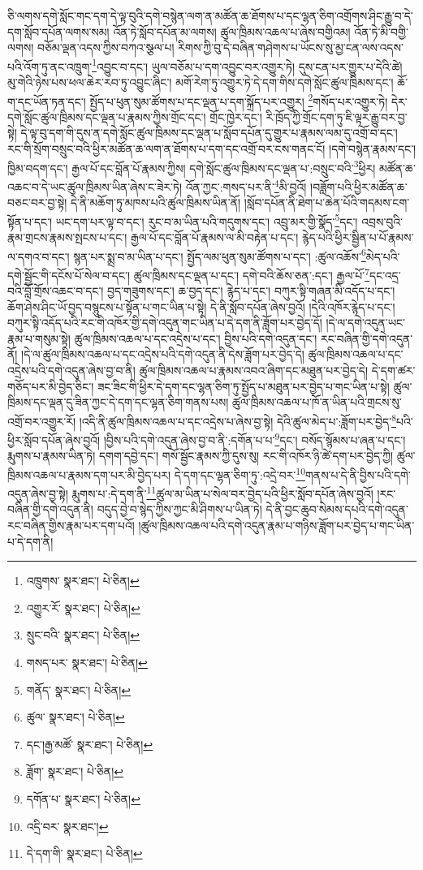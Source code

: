 ཅི་ལགས་དགེ་སློང་གང་དག་དེ་ལྟ་བུའི་དགེ་བསྙེན་ལག་ན་མཚོན་ཆ་ཐོགས་པ་དང་ལྷན་ཅིག་འགྲོགས་ཤིང་རྒྱུ་བ་དེ་དག་སློབ་དཔོན་ལགས་སམ། འོན་ཏེ་སློབ་དཔོན་མ་ལགས། ཚུལ་ཁྲིམས་འཆལ་པ་ཞེས་བགྱིའམ། འོན་ཏེ་མི་བགྱི་ལགས། བཅོམ་ལྡན་འདས་ཀྱིས་བཀའ་སྩལ་པ། རིགས་ཀྱི་བུ་དེ་བཞིན་གཤེགས་པ་ཡོངས་སུ་མྱ་ངན་ལས་འདས་པའི་འོག་ཏུ་ནང་འཁྲུག་\footnote{འཁྲུགས་  སྣར་ཐང་།  པེ་ཅིན། }འབྱུང་བ་དང་། ཡུལ་བཅོམ་པ་དག་འབྱུང་བར་འགྱུར་ཏེ། དུས་ངན་པར་གྱུར་པ་དེའི་ཚེ། མུ་གེའི་ཉེས་པས་ཕལ་ཆེར་རབ་ཏུ་འབྱུང་ཞིང་། མགོ་རེག་ཏུ་འགྱུར་ཏེ་དེ་དག་གིས་དགེ་སློང་ཚུལ་ཁྲིམས་དང་། ཆོ་ག་དང་ཡོན་ཏན་དང་། སྤྱོད་པ་ཕུན་སུམ་ཚོགས་པ་དང་ལྡན་པ་དག་སྐྲོད་པར་འགྱུར། \footnote{འགྱུར་རོ་  སྣར་ཐང་།  པེ་ཅིན། }གསོད་པར་འགྱུར་ཏེ། དེར་དགེ་སློང་ཚུལ་ཁྲིམས་དང་ལྡན་པ་རྣམས་ཀྱིས་གྲོང་དང་། གྲོང་ཁྱེར་དང་། རི་ཁྲོད་ཀྱི་གྲོང་དག་ཏུ་ཇི་ལྟར་རྒྱུ་བར་བྱ་སྟེ། དེ་ལྟ་བུ་དག་གི་དུས་ན་དགེ་སློང་ཚུལ་ཁྲིམས་དང་ལྡན་པ་སློབ་དཔོན་དུ་གྱུར་པ་རྣམས་ལམ་དུ་འགྲོ་བ་དང་། རང་གི་སྲོག་བསྲུང་བའི་ཕྱིར་མཚོན་ཆ་ལག་ན་ཐོགས་པ་དག་དང་འགྲོ་བར་ངས་གནང་ངོ། །དགེ་བསྙེན་རྣམས་དང་། ཁྱིམ་བདག་དང་། རྒྱལ་པོ་དང་བློན་པོ་རྣམས་ཀྱིས། དགེ་སློང་ཚུལ་ཁྲིམས་དང་ལྡན་པ་:བསྲུང་བའི་\footnote{སྲུང་བའི་  སྣར་ཐང་།  པེ་ཅིན། }ཕྱིར། མཚོན་ཆ་འཆང་བ་དེ་ཡང་ཚུལ་ཁྲིམས་ཡིན་ཞེས་ང་ཟེར་ཏེ། འོན་ཀྱང་:གསད་པར་ནི་\footnote{གསད་པར་  སྣར་ཐང་།  པེ་ཅིན། }མི་བྱའོ། །བཟློག་པའི་ཕྱིར་མཚོན་ཆ་བཅང་བར་བྱ་སྟེ། དེ་ནི་མཆོག་ཏུ་མཁས་པའི་ཚུལ་ཁྲིམས་ཡིན་ནོ། །སློབ་དཔོན་ནི་ཐེག་པ་ཆེན་པོའི་གདམས་ངག་སྟོན་པ་དང་། ཡང་དག་པར་ལྟ་བ་དང་། རུང་བ་མ་ཡིན་པའི་གདུགས་དང་། འབྲུ་མར་གྱི་སྣོད་\footnote{གནོད་  སྣར་ཐང་།  པེ་ཅིན། }དང་། འབྲས་བུའི་རྣམ་གྲངས་རྣམས་སྤངས་པ་དང་། རྒྱལ་པོ་དང་བློན་པོ་རྣམས་ལ་མི་བརྟེན་པ་དང་། རྙེད་པའི་ཕྱིར་སྦྱིན་པ་པོ་རྣམས་ལ་དགའ་བ་དང་། སྙན་པར་སྨྲ་བ་མ་ཡིན་པ་དང་། སྤྱོད་ལམ་ཕུན་སུམ་ཚོགས་པ་དང་། :ཚུལ་འཆོས་\footnote{ཚུལ་  སྣར་ཐང་།  པེ་ཅིན། }མེད་པའི་དགེ་སྦྱོང་གི་དངོས་པོ་སེལ་བ་དང་། ཚུལ་ཁྲིམས་དང་ལྡན་པ་དང་། དགེ་བའི་ཆོས་ཅན་:དང་། རྒྱལ་པོ་\footnote{དང་།རྒྱ་མཚོ་  སྣར་ཐང་།  པེ་ཅིན། }དང་འདྲ་བའི་བློ་གྲོས་འཆང་བ་དང་། བྱད་གཟུགས་དང་། ཆ་བྱད་དང་། རྙེད་པ་དང་། བཀུར་སྟི་གཞན་མི་འདོད་པ་དང་། ཆོག་ཤེས་ཤིང་ཡོ་བྱད་བསྙུངས་པ་སྟོན་པ་གང་ཡིན་པ་སྟེ། དེ་ནི་སློབ་དཔོན་ཞེས་བྱའོ། །དེའི་འཁོར་རྙེད་པ་དང་། བཀུར་སྟི་འདོད་པའི་རང་གི་འཁོར་གྱི་དགེ་འདུན་གང་ཡིན་པ་དེ་དག་ནི་ཟློག་པར་བྱེད་དོ། །དེ་ལ་དགེ་འདུན་ཡང་རྣམ་པ་གསུམ་སྟེ། ཚུལ་ཁྲིམས་འཆལ་པ་དང་འདྲེས་པ་དང་། བྱིས་པའི་དགེ་འདུན་དང་། རང་བཞིན་གྱི་དགེ་འདུན་ནོ། །དེ་ལ་ཚུལ་ཁྲིམས་འཆལ་པ་དང་འདྲེས་པའི་དགེ་འདུན་ནི་དེས་ཟློག་པར་བྱེད་དེ། ཚུལ་ཁྲིམས་འཆལ་པ་དང་འདྲེས་པའི་དགེ་འདུན་ཞེས་བྱ་བ་ནི། ཚུལ་ཁྲིམས་འཆལ་པ་རྣམས་འབའ་ཞིག་དང་མཐུན་པར་བྱེད་དེ། དེ་དག་ཚར་གཅོད་པར་མི་བྱེད་ཅིང་། ཟང་ཟིང་གི་ཕྱིར་དེ་དག་དང་ལྷན་ཅིག་ཏུ་སྤྱོད་པ་མཐུན་པར་བྱེད་པ་གང་ཡིན་པ་སྟེ། ཚུལ་ཁྲིམས་དང་ལྡན་དུ་ཟིན་ཀྱང་དེ་དག་དང་ལྷན་ཅིག་གནས་པས། ཚུལ་ཁྲིམས་འཆལ་པ་ཁོ་ན་ཡིན་པའི་གྲངས་སུ་འགྲོ་བར་འགྱུར་རོ། །འདི་ནི་ཚུལ་ཁྲིམས་འཆལ་པ་དང་འདྲེས་པ་ཞེས་བྱ་སྟེ། དེའི་ཚུལ་མེད་པ་:ཟློག་པར་བྱེད་\footnote{ཟློག་  སྣར་ཐང་།  པེ་ཅིན། }པའི་ཕྱིར་སློབ་དཔོན་ཞེས་བྱའོ། །བྱིས་པའི་དགེ་འདུན་ཞེས་བྱ་བ་ནི་:དགོན་པ་པ་\footnote{དགོན་པ་  སྣར་ཐང་།  པེ་ཅིན། }དང་། བསོད་སྙོམས་པ་ཞན་པ་དང་། རྨུགས་པ་རྣམས་ཡིན་ཏེ། དགག་དབྱེ་དང་། གསོ་སྦྱོང་རྣམས་ཀྱི་དུས་སུ། རང་གི་འཁོར་ཉི་ཚེ་དག་པར་བྱེད་ཀྱི། ཚུལ་ཁྲིམས་འཆལ་པ་རྣམས་དག་པར་མི་བྱེད་པར། དེ་དག་དང་ལྷན་ཅིག་ཏུ་:འདྲེ་བར་\footnote{འདྲི་བར་  སྣར་ཐང་། }གནས་པ་དེ་ནི་བྱིས་པའི་དགེ་འདུན་ཞེས་བྱ་སྟེ། རྨུགས་པ་:དེ་དག་ནི་\footnote{དེ་དག་གི་  སྣར་ཐང་།  པེ་ཅིན། }ཚུལ་མ་ཡིན་པ་སེལ་བར་བྱེད་པའི་ཕྱིར་སློབ་དཔོན་ཞེས་བྱའོ། །རང་བཞིན་གྱི་དགེ་འདུན་ནི། བདུད་བྱེ་བ་སྙེད་ཀྱིས་ཀྱང་མི་ཤིགས་པ་ཡིན་ཏེ། དེ་ནི་བྱང་ཆུབ་སེམས་དཔའི་དགེ་འདུན་རང་བཞིན་གྱིས་རྣམ་པར་དག་པའོ། །ཚུལ་ཁྲིམས་འཆལ་པའི་དགེ་འདུན་རྣམ་པ་གཉིས་ཟློག་པར་བྱེད་པ་གང་ཡིན་པ་དེ་དག་ནི། 